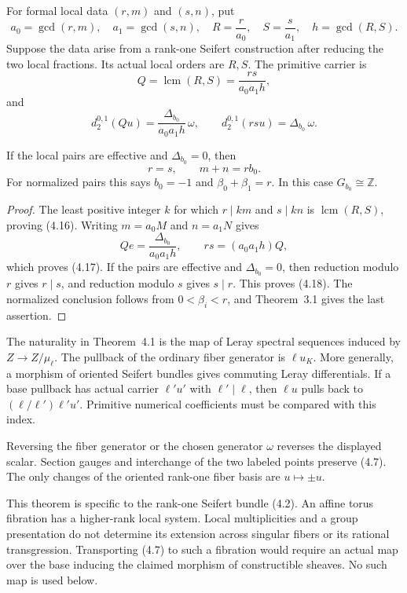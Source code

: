\documentclass[11pt]{article}
\numberwithin{equation}{section}
\begin{document}
\begin{proposition}
For formal local data $(r,m)$ and $(s,n)$, put
\[
 a_0=\gcd(r,m),\quad a_1=\gcd(s,n),\quad
 R=\frac r{a_0},\quad S=\frac s{a_1},\quad h=\gcd(R,S).          \tag{4.15}
\]
Suppose the data arise from a rank-one Seifert construction after
reducing the two local fractions. Its actual local orders are $R,S$.
The primitive carrier is
\[
 Q=\operatorname{lcm}(R,S)=\frac{rs}{a_0a_1h},                  \tag{4.16}
\]
and
\[
       d_2^{0,1}(Qu)=\frac{\Delta_{b_0}}{a_0a_1h}\,\omega,
       \qquad d_2^{0,1}(rsu)=\Delta_{b_0}\,\omega.              \tag{4.17}
\]

If the local pairs are effective and $\Delta_{b_0}=0$, then
\[
                 r=s,\qquad m+n=rb_0.                            \tag{4.18}
\]
For normalized pairs this says $b_0=-1$ and
$\beta_0+\beta_1=r$. In this case $G_{b_0}\cong\mathbb Z$.
\end{proposition}

\begin{proof}
The least positive integer $k$ for which $r\mid km$ and $s\mid kn$ is
$\operatorname{lcm}(R,S)$, proving (4.16).  Writing
$m=a_0M$ and $n=a_1N$ gives
\[
 Qe=\frac{\Delta_{b_0}}{a_0a_1h},
 \qquad rs=(a_0a_1h)Q,
\]
which proves (4.17).  If the pairs are effective and $\Delta_{b_0}=0$, then
reduction modulo $r$ gives $r\mid s$, and reduction modulo $s$ gives
$s\mid r$.  This proves (4.18).  The normalized conclusion follows from
$0<\beta_i<r$, and Theorem~3.1 gives the last assertion.
\end{proof}

\begin{remark}
The naturality in Theorem~4.1 is the map of Leray spectral sequences induced
by $Z\to Z/\mu_\ell$. The pullback of the ordinary fiber generator is
$\ell u_K$.  More generally, a morphism of oriented Seifert bundles gives
commuting Leray differentials.  If a base pullback has actual carrier $\ell'u'$ with $\ell'\mid\ell$,
then $\ell u$ pulls back to $(\ell/\ell')\ell'u'$.
Primitive numerical coefficients must be compared with this index.

Reversing the fiber generator or the chosen generator
$\omega$ reverses the displayed scalar.  Section gauges and interchange of
the two labeled points preserve (4.7). The only changes of the oriented
rank-one fiber basis are $u\mapsto\pm u$.

This theorem is specific to the rank-one Seifert bundle (4.2).  An affine torus fibration has a higher-rank local system.
Local multiplicities and a group presentation do not determine its
extension across singular fibers or its rational transgression.  Transporting (4.7) to such a fibration would
require an actual map over the base inducing the claimed morphism of
constructible sheaves.  No such map is used below.
\end{remark}
\end{document}
